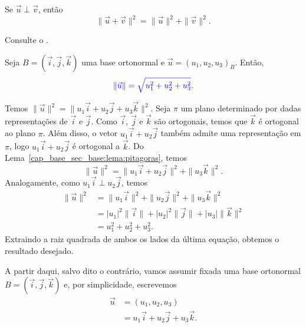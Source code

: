 \begin{lema}\label{cap_base_sec_base:lema:pitagoras}
  Se $\vec{u}\perp\vec{v}$, então 
  \begin{equation}
    \|\vec{u}+\vec{v}\|^2=\|\vec{u}\|^2+\|\vec{v}\|^2.
  \end{equation}
\end{lema}
\begin{demonstracao}
  Consulte o .
\end{demonstracao}

\begin{prop}\label{cap_base_sec_base:prop:norma}
  Seja $B = (\vec{i},\vec{j},\vec{k})$ uma base ortonormal e $\vec{u}=(u_1,u_2,u_3)_B$. Então,
 \begin{equation}\color{blue}\|\vec{u}\|=\sqrt{u_1^2+u_2^2+u_3^2}.
  \end{equation}
\end{prop}
\begin{dem}
  Temos $\|\vec{u}\|^2 = \|u_1\vec{i}+u_2\vec{j}+u_3\vec{k}\|^2$. Seja $\pi$ um plano determinado por dadas representações de $\vec{i}$ e $\vec{j}$. Como $\vec{i}$, $\vec{j}$ e $\vec{k}$ são ortogonais, temos que $\vec{k}$ é ortogonal ao plano $\pi$. Além disso, o vetor $u_1\vec{i}+u_2\vec{j}$ também admite uma representação em $\pi$, logo $u_1\vec{i}+u_2\vec{j}$ é ortogonal a $\vec{k}$. Do Lema~\ref{cap_base_sec_base:lema:pitagoras}, temos
  \begin{equation}
    \|\vec{u}\|^2 = \|u_1\vec{i}+u_2\vec{j}\|^2 + \|u_3\vec{k}\|^2.
  \end{equation}
  Analogamente, como $u_1\vec{i}\perp u_2\vec{j}$, temos
  \begin{align}
    \|\vec{u}\|^2 &= \|u_1\vec{i}\|^2 + \|u_2\vec{j}\|^2 + \|u_3\vec{k}\|^2\\
                &= |u_1|^2\|\vec{i}\| + |u_2|^2\|\vec{j}\| + |u_3|\|\vec{k}\|^2\\
                &= u_1^2 + u_2^2 + u_3^2.
  \end{align}
  Extraindo a raiz quadrada de ambos os lados da última equação, obtemos o resultado desejado.
\end{dem}

A partir daqui, salvo dito o contrário, vamos assumir fixada uma base ortonormal $B = (\vec{i}, \vec{j}, \vec{k})$ e, por simplicidade, escrevemos
\begin{align}
  \vec{u} &= (u_1, u_2, u_3)\\
          &= u_1\vec{i} + u_2\vec{j} + u_3\vec{k}.
\end{align}

